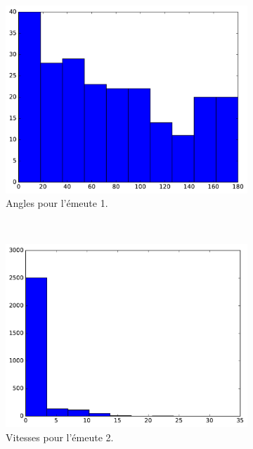 \begin{figure}[htb]
\begin{subfigure}[t]{\subImgWaStats}
			\centering
			\includegraphics[width=\textwidth]{figures/ch3/riot_angle}
			\caption{Angles pour l'émeute 1.}
			\label{fig:riot_angle}
		\end{subfigure}
		~
		\begin{subfigure}[t]{\subImgWaStats}
			\centering
			\includegraphics[width=\textwidth]{figures/ch3/riot2a_speed}
			\caption{Vitesses pour l'émeute 2.}
			\label{fig:riot2a_speed}
		\end{subfigure}
		~
		\begin{subfigure}[t]{\subImgWaStats}
			\centering

\end{subfigure}
\end{figure}
